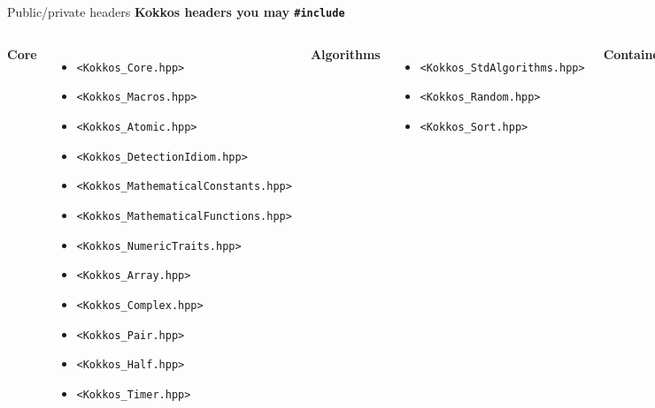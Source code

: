 \begin{frame}[fragile]{Public/private headers}
\textbf{Kokkos headers you may \texttt{\#include}}

\hspace{1em}
\begin{columns}
\tiny
{}
\textbf{Core}
\begin{itemize}
\item \texttt{<Kokkos\_Core.hpp>}
\item \texttt{<Kokkos\_Macros.hpp>}
\item \texttt{<Kokkos\_Atomic.hpp>}
\item \texttt{<Kokkos\_DetectionIdiom.hpp>}
\item \texttt{<Kokkos\_MathematicalConstants.hpp>}
\item \texttt{<Kokkos\_MathematicalFunctions.hpp>}
\item \texttt{<Kokkos\_NumericTraits.hpp>}
\item \texttt{<Kokkos\_Array.hpp>}
\item \texttt{<Kokkos\_Complex.hpp>}
\item \texttt{<Kokkos\_Pair.hpp>}
\item \texttt{<Kokkos\_Half.hpp>}
\item \texttt{<Kokkos\_Timer.hpp>}
\end{itemize}
\textbf{Algorithms}
\begin{itemize}
\item \texttt{<Kokkos\_StdAlgorithms.hpp>}
\item \texttt{<Kokkos\_Random.hpp>}
\item \texttt{<Kokkos\_Sort.hpp>}
\end{itemize}
\textbf{Containers}
\begin{itemize}
\item \texttt{<Kokkos\_Bit.hpp>}
\item \texttt{<Kokkos\_DualView.hpp>}
\item \texttt{<Kokkos\_DynRankView.hpp>}
\item \texttt{<Kokkos\_DynamicView.hpp>}
\item \texttt{<Kokkos\_ErrorReporter.hpp>}
\item \texttt{<Kokkos\_Functional.hpp>}
\item \texttt{<Kokkos\_OffsetView.hpp>}
\item \texttt{<Kokkos\_ScatterView.hpp>}
\item \texttt{<Kokkos\_StaticCrsGraph.hpp>}
\item \texttt{<Kokkos\_UnorderedMap.hpp>}
\item \texttt{<Kokkos\_Vector.hpp>}
\end{itemize}
\end{columns}

\end{frame}

